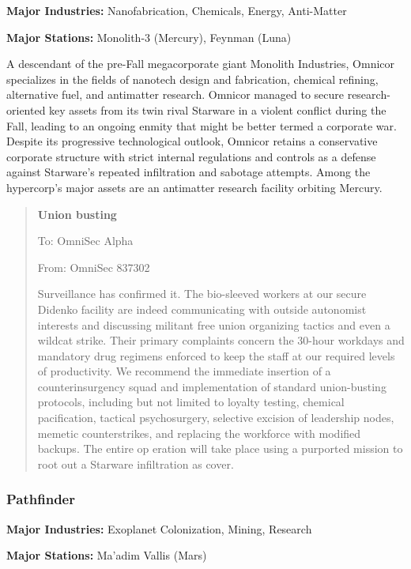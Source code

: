 \textbf{Major Industries:} Nanofabrication, Chemicals, Energy, Anti-Matter

\textbf{Major Stations:} Monolith-3 (Mercury), Feynman (Luna)


A descendant of the pre-Fall megacorporate giant Monolith Industries,
Omnicor specializes in the fields of nanotech design and fabrication,
chemical refining, alternative fuel, and antimatter research. Omnicor
managed to secure research-oriented key assets from its twin rival
Starware in a violent conflict during the Fall, leading to an ongoing
enmity that might be better termed a corporate war. Despite its
progressive technological outlook, Omnicor retains a conservative
corporate structure with strict internal regulations and controls as a
defense against Starware's repeated infiltration and sabotage
attempts. Among the hypercorp's major assets are an antimatter
research facility orbiting Mercury.

\begin{quotation}
  \textbf{Union busting}

  To: OmniSec Alpha

  From: OmniSec 837302


  Surveillance has confirmed it. The bio-sleeved workers at our secure
  Didenko facility are indeed communicating with outside autonomist
  interests and discussing militant free union organizing tactics and
  even a wildcat strike. Their primary complaints concern the 30-hour
  workdays and mandatory drug regimens enforced to keep the staff at
  our required levels of productivity. We recommend the immediate
  insertion of a counterinsurgency squad and implementation of
  standard union-busting protocols, including but not limited to
  loyalty testing, chemical pacification, tactical psychosurgery,
  selective excision of leadership nodes, memetic counterstrikes, and
  replacing the workforce with modified backups. The entire op eration
  will take place using a purported mission to root out a Starware
  infiltration as cover.
\end{quotation}


\subsubsection{Pathfinder}
\label{sec:pathfinder}

\textbf{Major Industries:} Exoplanet Colonization, Mining, Research

\textbf{Major Stations:} Ma'adim Vallis (Mars)


